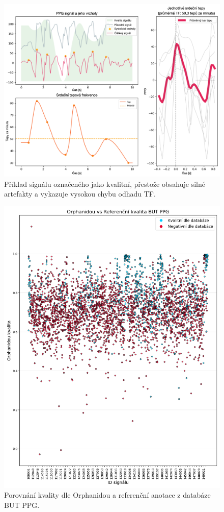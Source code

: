 \begin{figure}[ht]
	\centering
	\includegraphics[width=1\textwidth]{./obrazky/quality/good_but_not_good.png}
	\caption[Signál označený databází za kvalitní]{Příklad signálu označeného jako kvalitní, přestože obsahuje silné artefakty a vykazuje vysokou chybu odhadu \acs{TF}.}
	\label{fig:bad_quality_passed}
\end{figure}

\begin{figure}[ht]
	\centering
	\includegraphics[width=1\textwidth]{./obrazky/quality/Orphanidou_Ref_Q.png}
	\caption[Porovnání kvality dle Orphanidou a referenční anotace z databáze \acs{BUT PPG}]{Porovnání kvality dle Orphanidou a referenční anotace z databáze \acs{BUT PPG}.}
	\label{fig:orphanidou_mismatch}
\end{figure}
